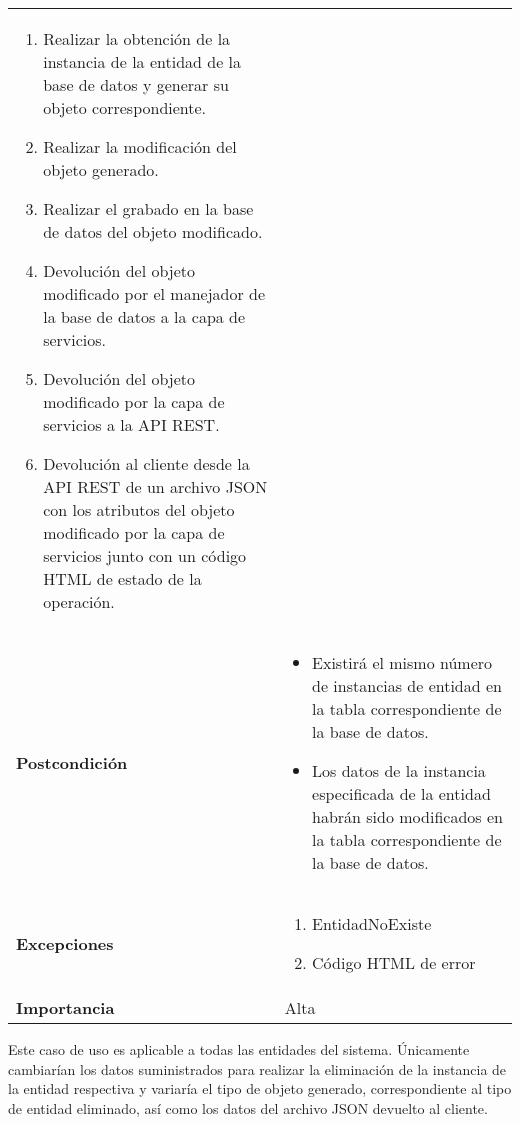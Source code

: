 \begin{longtable}{ p{} p{} }
\begin{enumerate}
        \item Realizar la obtención de la instancia de la entidad de la base de datos y generar su objeto correspondiente.
        \item Realizar la modificación del objeto generado.
        \item Realizar el grabado en la base de datos del objeto modificado.
        \item Devolución del objeto modificado por el manejador de la base de datos a la capa de servicios.
        \item Devolución del objeto modificado por la capa de servicios a la API REST.
        \item Devolución  al cliente  desde la API REST de un archivo JSON con los atributos del objeto modificado por la capa de servicios junto con un código HTML de estado de la operación. 
    \end{enumerate}\\
    \textbf{Postcondición}        & 
        \begin{itemize}
            \item Existirá el mismo número de instancias de entidad en la tabla correspondiente de la base de datos. 
            \item Los datos de la instancia especificada de la entidad habrán sido modificados en la tabla correspondiente de la base de datos.
        \end{itemize}\\
    \textbf{Excepciones}          & 
        \begin{enumerate}
            \item EntidadNoExiste
            \item Código HTML de error
        \end{enumerate} \\
    \textbf{Importancia}          & Alta \\
    \hline
\end{longtable}


\newpage
Este caso de uso es aplicable a todas las entidades del sistema. Únicamente cambiarían los datos suministrados para realizar la eliminación de la instancia de la entidad respectiva y variaría el tipo de objeto generado, correspondiente al tipo de entidad eliminado, así como los datos del archivo JSON devuelto al cliente.


